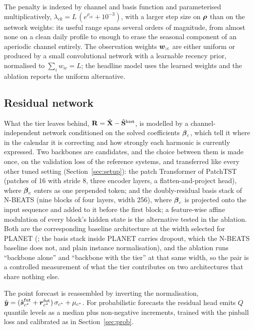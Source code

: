 The penalty is indexed by channel and basis function and parameterised multiplicatively,
$\lambda_{ck}=L\,(e^{\rho_{ck}}+10^{-3})$, with a larger step size on $\boldsymbol{\rho}$ than on the
network weights: its useful range spans several orders of magnitude, from almost none on a
clean daily profile to enough to erase the seasonal component of an aperiodic channel
entirely. The observation weights $\boldsymbol{w}_{:c}$ are either uniform or produced by a small
convolutional network with a learnable recency prior, normalised to $\sum_i w_{ic}=L$; the
headline model uses the learned weights and the ablation reports the uniform alternative.

\subsection{Residual network}
\label{sec:backbone}
What the tier leaves behind, $\mathbf{R}=\hat{\mathbf{X}}-\hat{\mathbf{S}}^{\text{hist}}$, is modelled by a
channel-independent network conditioned on the solved coefficients $\boldsymbol{\beta}_c$, which tell
it where in the calendar it is correcting and how strongly each harmonic is currently
expressed. Two backbones are candidates, and the choice between them is made once, on the validation loss
of the reference systems, and transferred like every other tuned setting
(Section~\ref{sec:setup}): the patch Transformer of PatchTST \cite{nie2023patchtst} (patches of 16 with stride 8, three encoder
layers, a flatten-and-project head), where $\boldsymbol{\beta}_c$ enters as one prepended token; and
the doubly-residual basis stack of N-BEATS \cite{oreshkin2020nbeats} (nine blocks of four
layers, width 256), where $\boldsymbol{\beta}_c$ is projected onto the input sequence and added to it
before the first block; a feature-wise affine modulation of every block's hidden state is the
alternative tested in the ablation. Both are the corresponding baseline architecture at the width selected for PLANET
(; the basis stack inside PLANET carries dropout, which the N-BEATS
baseline does not, and plain instance normalisation), and the ablation runs ``backbone
alone'' and ``backbone with the tier'' at that same width, so the pair is a controlled
measurement of what the tier contributes on two architectures that
share nothing else.

The point forecast is reassembled by inverting the normalisation,
$\hat{\boldsymbol{y}}=(\hat{\boldsymbol{s}}^{\text{fut}}_{c^\star}+\boldsymbol{r}^{\text{fut}}_{c^\star})\,\sigma_{c^\star}
+\mu_{c^\star}$. For probabilistic forecasts the residual head emits $Q$ quantile levels as a
median plus non-negative increments, trained with the pinball loss and calibrated as in
Section~\ref{sec:prob}.

